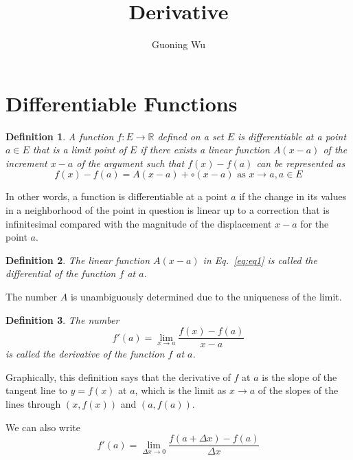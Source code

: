 \documentclass[a4paper,12pt]{article} %
\title{Derivative}
\author{Guoning Wu}
\newtheorem{definition}{Definition}[section]
\begin{document}
\tableofcontents
\setcounter{tocdepth}{2}
\listoffigures
\listoftables
\maketitle
\section{Differentiable Functions}
\begin{definition}
    A function $f: E \to \mathbb{R}$ defined on a set $E$ is 
    differentiable at a point $a \in E$ that is a limit point 
    of $E$ if there exists a linear function $A(x-a)$  of 
    the increment $x-a$ of the argument such that $f(x) - f(a)$
    can be represented as 
    \begin{equation}
        f(x) - f(a) = A(x-a) + \circ(x-a) \text{ as } x \to a, a \in E
        \label{eq:eq1}
    \end{equation}
\end{definition}

In other words, a function is differentiable at a point $a$ if 
the change in its values in a neighborhood of the point in 
question is linear up to a correction that is infinitesimal 
compared with the magnitude of the displacement $x - a$
for the point $a$.

\begin{definition}
    The linear function $A(x-a)$ in Eq.~\ref{eq:eq1} is called 
    the differential of the function $f$ at $a$.
\end{definition}

The number $A$ is unambiguously determined due to the uniqueness 
of the limit.

\begin{definition}
    The number 
    \begin{equation}
        f'(a) = \lim_{x \to a} \frac{f(x)-f(a)}{x-a}
        \label{eq:eq2}
    \end{equation}
    is called the derivative of the function $f$ at $a$.
\end{definition}

Graphically, this definition says that the derivative of $f$ at 
$a$ is the slope of the tangent line to $y = f(x)$ at $a$,
which is the limit as $x \to a$ of the slopes of the lines 
through $(x,f(x))$ and $(a,f(a))$.

We can also write 
\[
    f'(a) = \lim_{\Delta x \to 0} \frac{f(a+\Delta x) - f(a)}{\Delta x}
    \]
\end{document}
